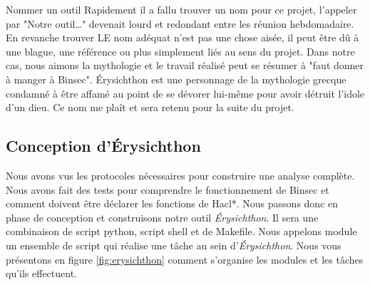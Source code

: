 \begin{CitationBox}{Nommer un outil}
    Rapidement il a fallu trouver un nom pour ce projet, l'appeler par "Notre outil\dots" devenait lourd et redondant entre les réunion hebdomadaire. En revanche trouver LE nom adéquat n'est pas une chose aisée, il peut être dû à une blague, une référence ou plus simplement liés au sens du projet. Dans notre cas, nous aimons la mythologie et le travail réalisé peut se résumer à "faut donner à manger à Binsec".\smallbreak
    Érysichthon est une personnage de la mythologie grecque condamné à être affamé au point de se dévorer lui-même pour avoir détruit l'idole d'un dieu. Ce nom me plaît et sera retenu pour la suite du projet. 
\end{CitationBox}

\subsection*{Conception d'Érysichthon}


Nous avons vus les protocoles nécessaires pour construire une analyse complète. Nous avons fait des tests pour comprendre le fonctionnement de Binsec et comment doivent être déclarer les fonctions de Hacl*. Nous passons donc en phase de conception et construisons notre outil \textit{Érysichthon}. Il sera une combinaison de script python, script shell et de Makefile. Nous appelons module un ensemble de script qui réalise une tâche au sein d'\textit{Érysichthon}. Nous vous présentons en figure \ref{fig:erysichthon} comment s'organise les modules et les tâches qu'ils effectuent.

